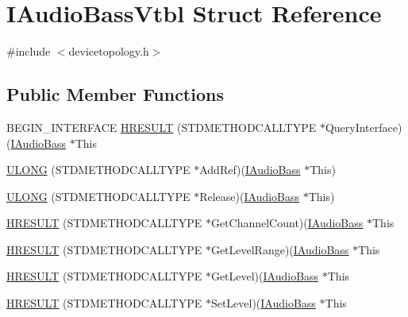\hypertarget{struct_i_audio_bass_vtbl}{}\section{I\+Audio\+Bass\+Vtbl Struct Reference}
\label{struct_i_audio_bass_vtbl}


{\ttfamily \#include $<$devicetopology.\+h$>$}

\subsection*{Public Member Functions}
\begin{DoxyCompactItemize}
\item 
B\+E\+G\+I\+N\+\_\+\+I\+N\+T\+E\+R\+F\+A\+CE \hyperlink{struct_i_audio_bass_vtbl_a11329afb7927b63723739eb148cfd4f1}{H\+R\+E\+S\+U\+LT} (S\+T\+D\+M\+E\+T\+H\+O\+D\+C\+A\+L\+L\+T\+Y\+PE $\ast$Query\+Interface)(\hyperlink{devicetopology_8h_a5f8da29f8b1203453acf3cff3f6b7603}{I\+Audio\+Bass} $\ast$This
\item 
\hyperlink{struct_i_audio_bass_vtbl_ae430474626b68deee61e8ff959e782be}{U\+L\+O\+NG} (S\+T\+D\+M\+E\+T\+H\+O\+D\+C\+A\+L\+L\+T\+Y\+PE $\ast$Add\+Ref)(\hyperlink{devicetopology_8h_a5f8da29f8b1203453acf3cff3f6b7603}{I\+Audio\+Bass} $\ast$This)
\item 
\hyperlink{struct_i_audio_bass_vtbl_a809ae45d3d60ba470ad3422855afaebf}{U\+L\+O\+NG} (S\+T\+D\+M\+E\+T\+H\+O\+D\+C\+A\+L\+L\+T\+Y\+PE $\ast$Release)(\hyperlink{devicetopology_8h_a5f8da29f8b1203453acf3cff3f6b7603}{I\+Audio\+Bass} $\ast$This)
\item 
\hyperlink{struct_i_audio_bass_vtbl_ab130236ef7144b982240fd59835bcad0}{H\+R\+E\+S\+U\+LT} (S\+T\+D\+M\+E\+T\+H\+O\+D\+C\+A\+L\+L\+T\+Y\+PE $\ast$Get\+Channel\+Count)(\hyperlink{devicetopology_8h_a5f8da29f8b1203453acf3cff3f6b7603}{I\+Audio\+Bass} $\ast$This
\item 
\hyperlink{struct_i_audio_bass_vtbl_a1a5e2fbe098f554649db245981f400ba}{H\+R\+E\+S\+U\+LT} (S\+T\+D\+M\+E\+T\+H\+O\+D\+C\+A\+L\+L\+T\+Y\+PE $\ast$Get\+Level\+Range)(\hyperlink{devicetopology_8h_a5f8da29f8b1203453acf3cff3f6b7603}{I\+Audio\+Bass} $\ast$This
\item 
\hyperlink{struct_i_audio_bass_vtbl_add8ece11d521458a9522ac99e3b9cf6f}{H\+R\+E\+S\+U\+LT} (S\+T\+D\+M\+E\+T\+H\+O\+D\+C\+A\+L\+L\+T\+Y\+PE $\ast$Get\+Level)(\hyperlink{devicetopology_8h_a5f8da29f8b1203453acf3cff3f6b7603}{I\+Audio\+Bass} $\ast$This
\item 
\hyperlink{struct_i_audio_bass_vtbl_a30a03f0bb84bab0ea6e53a37e3fe8c39}{H\+R\+E\+S\+U\+LT} (S\+T\+D\+M\+E\+T\+H\+O\+D\+C\+A\+L\+L\+T\+Y\+PE $\ast$Set\+Level)(\hyperlink{devicetopology_8h_a5f8da29f8b1203453acf3cff3f6b7603}{I\+Audio\+Bass} $\ast$This

\end{DoxyCompactItemize}
